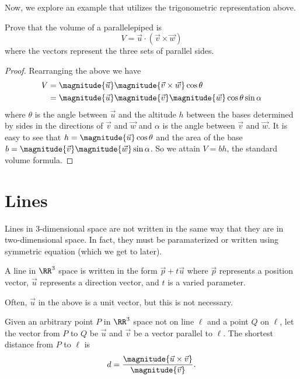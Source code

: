 Now, we explore an example that utilizes the trigonometric representation above.

\begin{example}
    Prove that the volume of a parallelepiped is
    \[V = \vec{u} \cdot (\vec{v} \times \vec{w})\]
    where the vectors represent the three sets of parallel sides.

    \begin{proof}
        Rearranging the above we have
        \begin{align*}
            V &= \magnitude{\vec{u}} \magnitude{\vec{v} \times \vec{w}} \cos\theta \\
            &= \magnitude{\vec{u}} \magnitude{\vec{v}} \magnitude{\vec{w}} \cos\theta \sin\alpha
        \end{align*}
        where $\theta$ is the angle between $\vec{u}$ and the altitude $h$ between the bases determined by sides in the directions of $\vec{v}$ and $\vec{w}$ and $\alpha$ is the angle between $\vec{v}$ and $\vec{w}$. It is easy to see that $h = \magnitude{\vec{u}}\cos\theta$ and the area of the base $b = \magnitude{\vec{v}} \magnitude{\vec{w}} \sin\alpha$. So we attain $V = bh$, the standard volume formula.
    \end{proof}
\end{example}

\section{Lines}

Lines in 3-dimensional space are not written in the same way that they are in two-dimensional space. In fact, they must be paramaterized or written using symmetric equation (which we get to later).

\begin{definition}
    A line in $\RR^{3}$ space is written in the form $\vec{p} + t\vec{u}$ where $\vec{p}$ represents a position vector, $\vec{u}$ represents a direction vector, and $t$ is a varied parameter.
\end{definition}

\begin{remark}
    Often, $\vec{u}$ in the above is a unit vector, but this is not necessary.
\end{remark}

\begin{theorem}
    Given an arbitrary point $P$ in $\RR^{3}$ space not on line $\ell$ and a point $Q$ on $\ell$, let the vector from $P$ to $Q$ be $\vec{u}$ and $\vec{v}$ be a vector parallel to $\ell$. The shortest distance from $P$ to $\ell$ is
    \[d = \frac{\magnitude{\vec{u} \times \vec{v}}}{\magnitude{\vec{v}}}.\]
\end{theorem}

